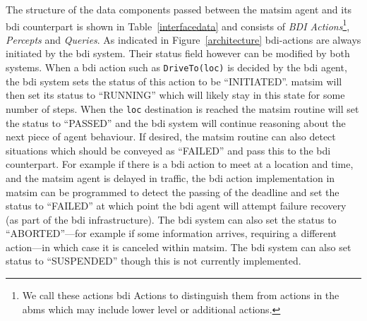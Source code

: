 The structure of the data components passed between the \gls{matsim} agent
and its \gls{bdi} counterpart is shown in Table~\ref{interfacedata} and
consists of {\it BDI Actions}\footnote{We call these actions \gls{bdi}
  Actions to distinguish them from actions in the \gls{abms} which may
  include lower level or additional actions.}, {\it Percepts} and {\it
  Queries}. As indicated in Figure~\ref{architecture} \gls{bdi}-actions are
always initiated by the \gls{bdi} system. Their status field however can be
modified by both systems.  When a \gls{bdi} action such as
\lstinline{DriveTo(loc)} is decided by the \gls{bdi} agent, the \gls{bdi} system
sets the status of this action to be ``INITIATED''. \gls{matsim} will then
set its status to ``RUNNING'' which will likely stay in this state for
some number of steps. When the \lstinline{loc} destination is reached
the \gls{matsim} routine will set the status to ``PASSED'' and the \gls{bdi}
system will continue reasoning about the next piece of agent
behaviour. If desired, the \gls{matsim} routine can also detect situations
which should be conveyed as ``FAILED'' and pass this to the \gls{bdi}
counterpart. For example if there is a \gls{bdi} action to meet at a
location and time, and the \gls{matsim} agent is delayed in traffic, the \gls{bdi}
action implementation in \gls{matsim} can be programmed to detect the
passing of the deadline and set the status to ``FAILED'' at which
point the \gls{bdi} agent will attempt failure recovery (as part of the \gls{bdi}
infrastructure). The \gls{bdi} system can also set the status to 
``ABORTED''---for example if some information arrives, requiring a different
action---in which case it is canceled within \gls{matsim}. The \gls{bdi} system
can also set status to ``SUSPENDED'' though this is not currently
implemented.


